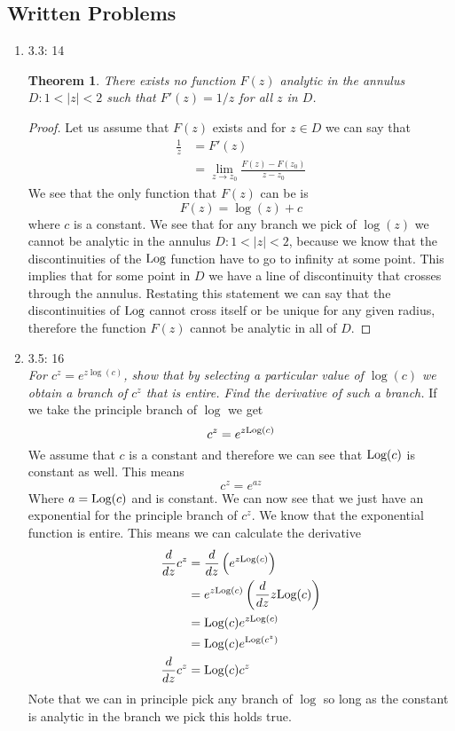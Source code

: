 \documentclass[11pt]{article}
\newcommand{\Log}{\textnormal{Log}}
\begin{document}

\subsection*{Written Problems}
\begin{enumerate}

\item 3.3: 14
\newtheorem{Theo1}{Theorem}
\begin{Theo1}
There exists no function $F(z)$ analytic in the annulus $D:1<|z|<2$ such that $F'(z) = 1/z$ for all $z$ in $D$.
\end{Theo1}
\begin{proof}
Let us assume that $F(z)$ exists and for $z\in D$ we can say that
\begin{align*}
\frac{1}{z} &= F'(z)\\
	&=\lim_{z\rightarrow z_0} \frac{F(z)-F(z_0)}{z-z_0}		
\end{align*}
We see that the only function that $F(z)$ can be is 
$$F(z) = \log(z) + c$$
where $c$ is a constant. We see that for any branch we pick of $\log(z)$ we cannot be analytic in the annulus $D:1<|z|<2$, because we know that the discontinuities of the $\Log$ function have to go to infinity at some point. This implies that for some point in $D$ we have a line of discontinuity that crosses through the annulus. Restating this statement we can say that the discontinuities of $\Log$ cannot cross itself or be unique for any given radius, therefore the function $F(z)$ cannot be analytic in all of $D$.
\end{proof}

\item 3.5: 16\\
\textit{For $c^z = e^{z\log(c)}$, show that by selecting a particular value of $\log(c)$ we obtain a branch of $c^z$ that is entire. Find the derivative of such a branch.}
If we take the principle branch of $\log$ we get
$$c^z = e^{z\Log(c)}$$
We assume that $c$ is a constant and therefore we can see that $\Log(c)$ is constant as well. This means
$$c^z = e^{az}$$
Where $a=\Log(c)$ and is constant. We can now see that we just have an exponential for the principle branch of $c^z$. We know that the exponential function is entire. This means we can calculate the derivative
\begin{align*}
\frac{d}{dz}c^z &= \frac{d}{dz}\left(e^{z\Log(c)}\right)\\
&= e^{z\Log(c)}\left(\frac{d}{dz}z\Log(c)\right)\\
&= \Log(c)e^{z\Log(c)}\\
&= \Log(c)e^{\Log(c^z)}\\
\frac{d}{dz}c^z &= \Log(c)c^z\\
\end{align*}
Note that we can in principle pick any branch of $\log$ so long as the constant is analytic in the branch we pick this holds true.
\end{enumerate}
\end{document}
